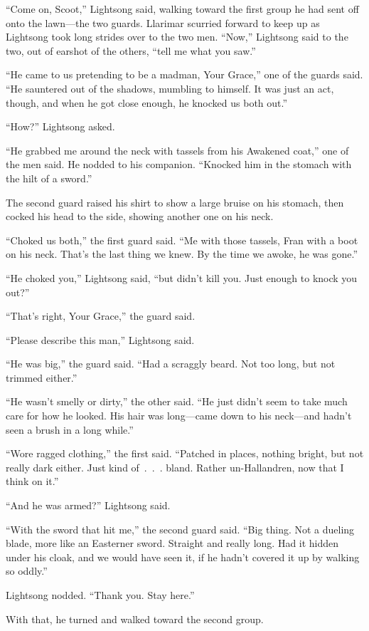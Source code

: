 “Come on, Scoot,” Lightsong said, walking toward the first group he had sent off onto the lawn—the two guards. Llarimar scurried forward to keep up as Lightsong took long strides over to the two men. “Now,” Lightsong said to the two, out of earshot of the others, “tell me what you saw.”

“He came to us pretending to be a madman, Your Grace,” one of the guards said. “He sauntered out of the shadows, mumbling to himself. It was just an act, though, and when he got close enough, he knocked us both out.”

“How?” Lightsong asked.

“He grabbed me around the neck with tassels from his Awakened coat,” one of the men said. He nodded to his companion. “Knocked him in the stomach with the hilt of a sword.”

The second guard raised his shirt to show a large bruise on his stomach, then cocked his head to the side, showing another one on his neck.

“Choked us both,” the first guard said. “Me with those tassels, Fran with a boot on his neck. That’s the last thing we knew. By the time we awoke, he was gone.”

“He choked you,” Lightsong said, “but didn’t kill you. Just enough to knock you out?”

“That’s right, Your Grace,” the guard said.

“Please describe this man,” Lightsong said.

“He was big,” the guard said. “Had a scraggly beard. Not too long, but not trimmed either.”

“He wasn’t smelly or dirty,” the other said. “He just didn’t seem to take much care for how he looked. His hair was long—came down to his neck—and hadn’t seen a brush in a long while.”

“Wore ragged clothing,” the first said. “Patched in places, nothing bright, but not really dark either. Just kind of~.~.~. bland. Rather un-Hallandren, now that I think on it.”

“And he was armed?” Lightsong said.

“With the sword that hit me,” the second guard said. “Big thing. Not a dueling blade, more like an Easterner sword. Straight and really long. Had it hidden under his cloak, and we would have seen it, if he hadn’t covered it up by walking so oddly.”

Lightsong nodded. “Thank you. Stay here.”

With that, he turned and walked toward the second group.

